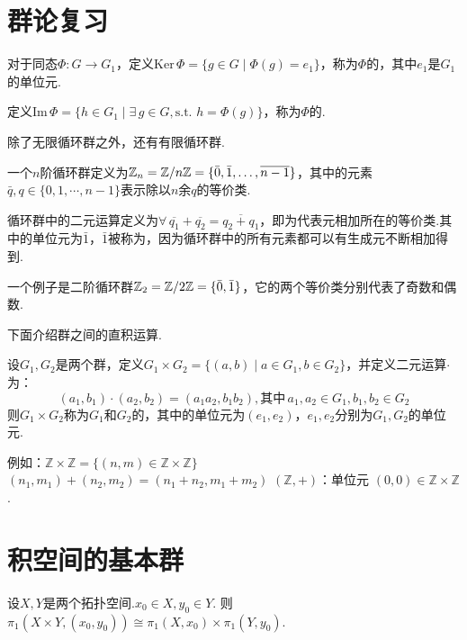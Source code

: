 \section{群论复习}

\begin{definition}[核和像][def:10.14]
    对于同态$\Phi: G \to G_1$，定义$\mathrm{Ker}\,\Phi = \{g \in G \mid \Phi(g) = e_1\}$，称为$\Phi$的，其中$e_1$是$G_1$的单位元.\par
    定义$\mathrm{Im}\,\Phi = \{h \in G_1 \mid \exists\,g \in G, \text{s.t. } h = \Phi(g)\}$，称为$\Phi$的.
\end{definition}

除了无限循环群之外，还有有限循环群.\par
一个$n$阶循环群定义为$\mathbb{Z}_n=\mathbb{Z}/n\mathbb{Z}=\{\bar{0}, \bar{1}, \dots, \overline{n-1}\}$，其中的元素$\bar{q},q\in\{0,1,\cdots,n-1\}$表示除以$n$余$q$的等价类.\par
循环群中的二元运算定义为$\forall\,\overline{q_1}+\overline{q_2}=\overline{q_2+q_1}$，即为代表元相加所在的等价类.其中的单位元为$\bar{1}$，$\bar{1}$被称为，因为循环群中的所有元素都可以有生成元不断相加得到.\par
一个例子是二阶循环群$\mathbb{Z}_2=\mathbb{Z}/2\mathbb{Z} = \{\bar{0}, \bar{1}\}$，它的两个等价类分别代表了奇数和偶数.\par
下面介绍群之间的直积运算.\par
\begin{definition}[直积][def:10.15]
    设$G_1,G_2$是两个群，定义$G_1 \times G_2 = \{(a,b) \mid a \in G_1, b \in G_2\}$，并定义二元运算$\cdot$为：
    \[ (a_1, b_1) \cdot (a_2, b_2) = (a_1 a_2, b_1 b_2),\text{其中}\,a_1,a_2\in G_1, b_1,b_2 \in G_2 \]
    则$G_1\times G_2$称为$G_1$和$G_2$的，其中的单位元为$(e_1,e_2)$，$e_1,e_2$分别为$G_1,G_2$的单位元.
\end{definition}
例如：$\mathbb{Z} \times \mathbb{Z} = \{(n, m) \in \mathbb{Z} \times \mathbb{Z}\}$
$(n_1, m_1) + (n_2, m_2) = (n_1+n_2, m_1+m_2)$
$(\mathbb{Z}, +)$：单位元 $(0,0) \in \mathbb{Z} \times \mathbb{Z}$.

\section{积空间的基本群}

\begin{theorem}[][thm:10.4]
    设$X, Y$是两个拓扑空间.$x_0 \in X, y_0 \in Y$.
    则 $\pi_1(X \times Y, (x_0, y_0)) \cong \pi_1(X, x_0) \times \pi_1(Y, y_0)$.
\end{theorem}

